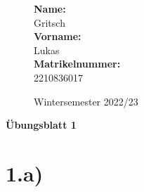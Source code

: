 \documentclass[10pt,ngerman]{scrartcl}
\begin{document}
\begin{figure}[htbp]
\begin{minipage}[b]{0.50\linewidth}
\begin{Large}

	\textbf{Name:}\\
	Gritsch 			\\
	\textbf{Vorname:}\\
	Lukas 				\\
	\textbf{Matrikelnummer:}\\
	2210836017

\end{Large}
\end{minipage}
\begin{minipage}[b]{0.50\linewidth}
\begin{flushright}
\begin{Huge}
\end{Huge}
\vspace{10px}
\begin{large}
Wintersemester 2022/23
\end{large}
\end{flushright}
\end{minipage}
\end{figure}

\vspace{20px}
\begin{huge}
\noindent

\textbf{Übungsblatt 1}
\end{huge}

\pagebreak
\section{1.a)}
\end{document}
